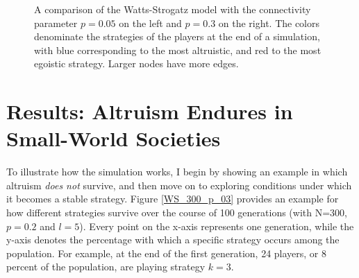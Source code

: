 \documentclass{JASSS}
\begin{document}
\begin{figure}%
	\centering
	\qquad
	\caption{A comparison of the Watts-Strogatz model with  the connectivity parameter $p=0.05$ on the left and $p=0.3$ on the right. The colors denominate the strategies of the players at the end of a simulation, with blue corresponding to the most altruistic, and red to the most egoistic strategy. Larger nodes have more edges.}%
	\label{WS_300_illustrate_p}%
\end{figure}

\section*{Results: Altruism Endures in Small-World Societies}
To illustrate how the simulation works, I begin by showing an example in which altruism \textit{does not} survive, and then move on to exploring conditions under which it becomes a stable strategy. Figure \ref{WS_300_p_03} provides an example for how different strategies survive over the course of 100 generations (with N=300, $p=0.2$ and $l=5$). Every point on the x-axis represents one generation, while the y-axis denotes the percentage with which a specific strategy occurs among the population. For example, at the end of the first generation, 24 players, or 8 percent of the population, are playing strategy $k=3$.
\end{document}

